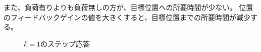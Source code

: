 また、負荷有りよりも負荷無しの方が、目標位置への所要時間が少ない。
位置のフィードバックゲインの値を大きくすると、目標位置までの所要時間が減少する。


\begin{figure}
  \begin{center}
  \caption{$k = 1$のステップ応答}
  \end{center}
\end{figure}

